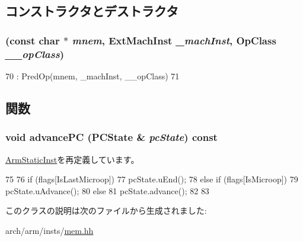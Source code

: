 \subsection{コンストラクタとデストラクタ}
\hypertarget{classArmISA_1_1MightBeMicro_ac2a6672be551ef838c8df04c8079f2dc}{
\subsubsection[{MightBeMicro}]{ (const char $\ast$ {\em mnem}, \/  {\bf ExtMachInst} {\em \_\-machInst}, \/  OpClass {\em \_\-\_\-opClass})}}
\label{classArmISA_1_1MightBeMicro_ac2a6672be551ef838c8df04c8079f2dc}



\begin{DoxyCode}
70         : PredOp(mnem, _machInst, __opClass)
71     {}
\end{DoxyCode}


\subsection{関数}
\hypertarget{classArmISA_1_1MightBeMicro_af04cd01429462d48e635f3e01ced6257}{
\subsubsection[{advancePC}]{\setlength{\rightskip}{0pt plus 5cm}void advancePC (PCState \& {\em pcState}) const}}
\label{classArmISA_1_1MightBeMicro_af04cd01429462d48e635f3e01ced6257}


\hyperlink{classArmISA_1_1ArmStaticInst_af04cd01429462d48e635f3e01ced6257}{ArmStaticInst}を再定義しています。


\begin{DoxyCode}
75     {
76         if (flags[IsLastMicroop]) {
77             pcState.uEnd();
78         } else if (flags[IsMicroop]) {
79             pcState.uAdvance();
80         } else {
81             pcState.advance();
82         }
83     }
\end{DoxyCode}


このクラスの説明は次のファイルから生成されました:\begin{DoxyCompactItemize}
\item 
arch/arm/insts/\hyperlink{arm_2insts_2mem_8hh}{mem.hh}\end{DoxyCompactItemize}

